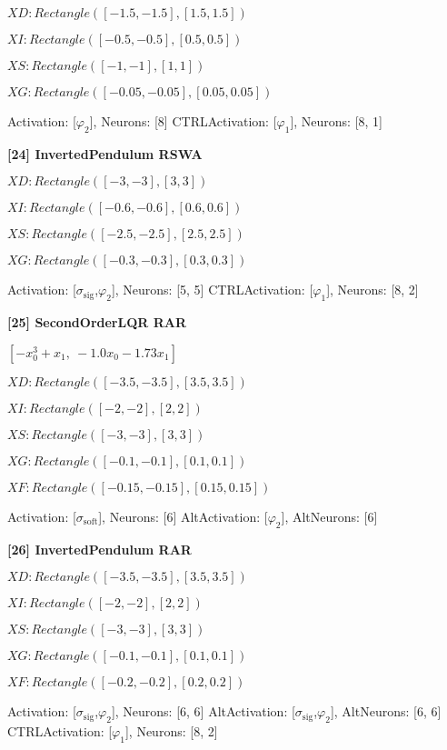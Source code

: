  $XD: Rectangle([-1.5, -1.5], [1.5, 1.5]) $

$XI: Rectangle([-0.5, -0.5], [0.5, 0.5]) $

$XS: Rectangle([-1, -1], [1, 1]) $

$XG: Rectangle([-0.05, -0.05], [0.05, 0.05]) $


Activation: [$\varphi_{2}$], Neurons: [8]
CTRLActivation: [$\varphi_{1}$], Neurons: [8, 1]

\textbf{ [24] InvertedPendulum RSWA }

 
 $XD: Rectangle([-3, -3], [3, 3]) $

$XI: Rectangle([-0.6, -0.6], [0.6, 0.6]) $

$XS: Rectangle([-2.5, -2.5], [2.5, 2.5]) $

$XG: Rectangle([-0.3, -0.3], [0.3, 0.3]) $


Activation: [$\sigma_{\mathrm{sig}}$,$\varphi_{2}$], Neurons: [5, 5]
CTRLActivation: [$\varphi_{1}$], Neurons: [8, 2]

\textbf{ [25] SecondOrderLQR RAR }

$\left[ - x_{0}^{3} + x_{1}, \  - 1.0 x_{0} - 1.73 x_{1}\right]$ 
 
 $XD: Rectangle([-3.5, -3.5], [3.5, 3.5]) $

$XI: Rectangle([-2, -2], [2, 2]) $

$XS: Rectangle([-3, -3], [3, 3]) $

$XG: Rectangle([-0.1, -0.1], [0.1, 0.1]) $

$XF: Rectangle([-0.15, -0.15], [0.15, 0.15]) $


Activation: [$\sigma_{\mathrm{soft}}$], Neurons: [6]
AltActivation: [$\varphi_{2}$], AltNeurons: [6]

\textbf{ [26] InvertedPendulum RAR }

 
 $XD: Rectangle([-3.5, -3.5], [3.5, 3.5]) $

$XI: Rectangle([-2, -2], [2, 2]) $

$XS: Rectangle([-3, -3], [3, 3]) $

$XG: Rectangle([-0.1, -0.1], [0.1, 0.1]) $

$XF: Rectangle([-0.2, -0.2], [0.2, 0.2]) $


Activation: [$\sigma_{\mathrm{sig}}$,$\varphi_{2}$], Neurons: [6, 6]
AltActivation: [$\sigma_{\mathrm{sig}}$,$\varphi_{2}$], AltNeurons: [6, 6]
CTRLActivation: [$\varphi_{1}$], Neurons: [8, 2]

